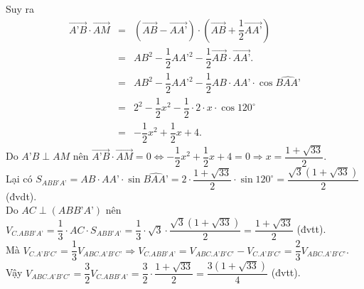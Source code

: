 \begin{ex}
{{}
		\noindent	Suy ra
		\allowdisplaybreaks
		\begin{eqnarray*}
			\overrightarrow{A’B}\cdot\overrightarrow{AM} &=&\left(\overrightarrow{AB}-\overrightarrow{AA’}\right)\cdot\left(\overrightarrow{AB}+\dfrac{1}{2}\overrightarrow{AA’}\right)\\ &=&AB^2-\dfrac{1}{2}AA’^2-\dfrac{1}{2}\overrightarrow{AB}\cdot\overrightarrow{AA’}.\\
			&=&AB^2-\dfrac{1}{2}AA’^2-\dfrac{1}{2}AB\cdot AA’\cdot\cos\widehat{BAA’}\\ &=&2^2-\dfrac{1}{2}x^2-\dfrac{1}{2}\cdot 2\cdot x\cdot\cos 120^{\circ}\\ &=&-\dfrac{1}{2}x^2+\dfrac{1}{2}x+4.
		\end{eqnarray*}
		Do $A’B\perp AM$ nên $\overrightarrow{A’B}\cdot\overrightarrow{AM}=0\Leftrightarrow-\dfrac{1}{2}x^2+\dfrac{1}{2}x+4=0\Rightarrow x=\dfrac{1+\sqrt{33}}{2}$.\\
		Lại có $S_{ABB’A’}=AB\cdot AA’\cdot\sin\widehat{BAA’}=2\cdot\dfrac{1+\sqrt{33}}{2}\cdot\sin 120^{\circ} =\dfrac{\sqrt{3}\left(1+\sqrt{33}\right)}{2}$ (đvdt).\\
		Do $AC\perp(ABB’A’)$ nên $V_{C.ABB’A’}=\dfrac{1}{3}\cdot AC\cdot S_{ABB’A’}=\dfrac{1}{3}\cdot\sqrt{3}\cdot\dfrac{\sqrt{3}\left(1+\sqrt{33}\right)}{2}=\dfrac{1+\sqrt{33}}{2}$ (đvtt).\\
		Mà $V_{C.A’B’C’}=\dfrac{1}{3}V_{ABC.A’B’C’}\Rightarrow V_{C.ABB’A’}=V_{ABC.A’B’C’}-V_{C.A’B’C’}=\dfrac{2}{3}V_{ABC.A’B’C’}$.\\
		Vậy $V_{ABC.A’B’C’}=\dfrac{3}{2}V_{C.ABB’A’}=\dfrac{3}{2}\cdot\dfrac{1+\sqrt{33}}{2}=\dfrac{3\left(1+\sqrt{33}\right)}{4}$ (đvtt).}
\end{ex}
